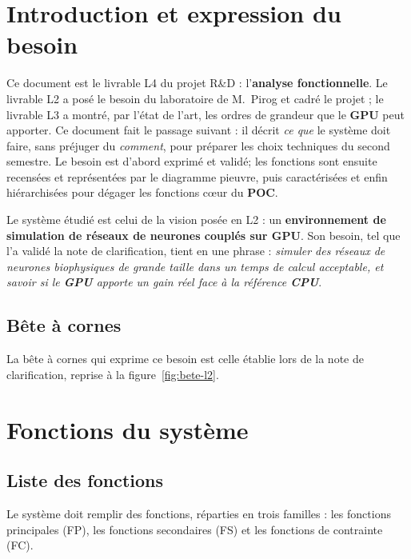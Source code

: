\chapter{Introduction et expression du besoin}

Ce document est le livrable L4 du projet R\&D : l'\textbf{analyse fonctionnelle}. Le livrable L2 a posé le besoin du laboratoire de M.~Pirog et cadré le projet ; le livrable L3 a montré, par l'état de l'art, les ordres de grandeur que le \textbf{GPU} peut apporter. Ce document fait le passage suivant : il décrit \emph{ce que} le système doit faire, sans préjuger du \emph{comment}, pour préparer les choix techniques du second semestre. Le besoin est d'abord exprimé et validé; les fonctions sont ensuite recensées et représentées par le diagramme pieuvre, puis caractérisées et enfin hiérarchisées pour dégager les fonctions cœur du \textbf{POC}.

Le système étudié est celui de la vision posée en L2 : un \textbf{environnement de simulation de réseaux de neurones couplés sur GPU}. Son besoin, tel que l'a validé la note de clarification, tient en une phrase : \emph{simuler des réseaux de neurones biophysiques de grande taille dans un temps de calcul acceptable, et savoir si le \textbf{GPU} apporte un gain réel face à la référence \textbf{CPU}}.

\section{Bête à cornes}

La bête à cornes qui exprime ce besoin est celle établie lors de la note de clarification, reprise à la figure~\ref{fig:bete-l2}.

\chapter{Fonctions du système}

\section{Liste des fonctions}

Le système doit remplir des fonctions, réparties en trois familles : les fonctions principales (FP), les fonctions secondaires (FS) et les fonctions de contrainte (FC). 

